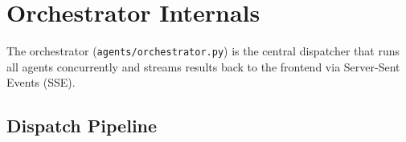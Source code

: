 \documentclass[11pt,a4paper]{article}
\begin{document}
\newpage
\section{Orchestrator Internals}

The orchestrator (\texttt{agents/orchestrator.py}) is the central dispatcher that runs all agents concurrently and streams results back to the frontend via Server-Sent Events (SSE).

\subsection{Dispatch Pipeline}
\end{document}
